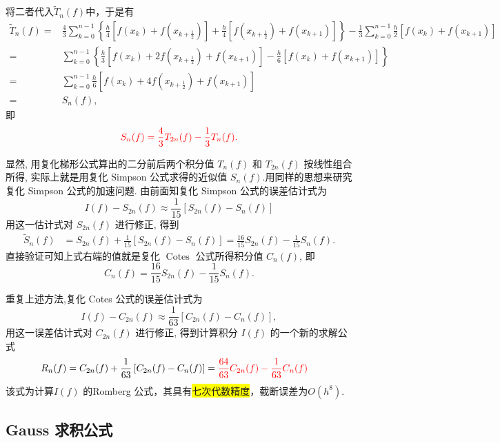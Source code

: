 将二者代入$\widetilde{T}_{n}(f)$中，于是有
$$
\begin{aligned}
\widetilde{T}_{n}(f)= & \frac{4}{3} \sum_{k=0}^{n-1}\left\{\frac{h}{4}\left[f\left(x_{k}\right)+f\left(x_{k+\frac{1}{2}}\right)\right]+\frac{h}{4}\left[f\left(x_{k+\frac{1}{2}}\right)+f\left(x_{k+1}\right)\right]\right\}  -\frac{1}{3} \sum_{k=0}^{n-1} \frac{h}{2}\left[f\left(x_{k}\right)+f\left(x_{k+1}\right)\right] \\
= & \sum_{k=0}^{n-1}\left\{\frac{h}{3}\left[f\left(x_{k}\right)+2 f\left(x_{k+\frac{1}{2}}\right)+f\left(x_{k+1}\right)\right]-\frac{h}{6}\left[f\left(x_{k}\right)+f\left(x_{k+1}\right)\right]\right\} \\
= & \sum_{k=0}^{n-1} \frac{h}{6}\left[f\left(x_{k}\right)+4 f\left(x_{k+\frac{1}{2}}\right)+f\left(x_{k+1}\right)\right] \\
= & S_{n}(f),
\end{aligned}
$$
即
$$
\textcolor{red}{S_{n}(f)=\frac{4}{3} T_{2 n}(f)-\frac{1}{3} T_{n}(f) .}
$$

显然, 用复化梯形公式算出的二分前后两个积分值 $ T_{n}(f) $ 和 $ T_{2 n}(f) $ 按线性组合所得, 实际上就是用复化 Simpson 公式求得的近似值 $ S_{n}(f) $.用同样的思想来研究复化 Simpson 公式的加速问题. 由前面知复化 Simpson 公式的误差估计式为
$$
I(f)-S_{2 n}(f) \approx \frac{1}{15}\left[S_{2 n}(f)-S_{n}(f)\right]
$$
用这一估计式对 $ S_{2 n}(f) $ 进行修正, 得到
$$
\begin{aligned}
\tilde{S}_{n}(f) & =S_{2 n}(f)+\frac{1}{15}\left[S_{2 n}(f)-S_{n}(f)\right]  =\frac{16}{15} S_{2 n}(f)-\frac{1}{15} S_{n}(f) .
\end{aligned}
$$
直接验证可知上式右端的值就是复化 $ \operatorname{Cotes} $ 公式所得积分值 $ C_{n}(f) $, 即
$$
C_{n}(f)=\frac{16}{15} S_{2 n}(f)-\frac{1}{15} S_{n}(f) .
$$

重复上述方法,复化 Cotes 公式的误差估计式为
$$
I(f)-C_{2 n}(f) \approx \frac{1}{63}\left[C_{2 n}(f)-C_{n}(f)\right],
$$
用这一误差估计式对 $ C_{2 n}(f) $ 进行修正, 得到计算积分 $ I(f) $ 的一个新的求解公式
$$
\begin{aligned}
R_{n}(f) & =C_{2 n}(f)+\frac{1}{63}\left[C_{2 n}(f)-C_{n}(f)\right] =\textcolor{red}{\frac{64}{63} C_{2 n}(f)-\frac{1}{63} C_{n}(f)}
\end{aligned}
$$
该式为计算$I(f)$ 的Romberg 公式，其具有\colorbox{yellow}{七次代数精度}，截断误差为$O(h^8)$.
\subsection{Gauss 求积公式}

